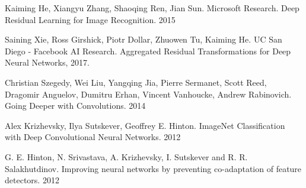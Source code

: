 \documentclass{article}
\begin{document}
\begin{thebibliography}{1}
	Kaiming He, Xiangyu Zhang, Shaoqing Ren, Jian Sun. Microsoft Research. 
	Deep Residual Learning for Image Recognition. 2015
	
	Saining Xie, Ross Girshick, Piotr Dollar, Zhuowen Tu, Kaiming He. UC San Diego - Facebook AI Research. Aggregated Residual Transformations for Deep Neural Networks, 2017.
	
	Christian Szegedy, Wei Liu, Yangqing Jia, Pierre Sermanet, Scott Reed, Dragomir Anguelov, Dumitru Erhan, Vincent Vanhoucke, Andrew Rabinovich. Going Deeper with Convolutions. 2014
	
	Alex Krizhevsky, Ilya Sutskever, Geoffrey E. Hinton. ImageNet Classification with Deep Convolutional
	Neural Networks. 2012
	
	G. E. Hinton, N. Srivastava, A. Krizhevsky, I. Sutskever and R. R. Salakhutdinov.
	Improving neural networks by preventing co-adaptation of feature detectors. 2012
	
	
\end{thebibliography}
\end{document}
